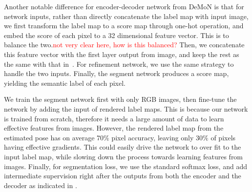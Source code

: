 Another notable difference for encoder-decoder network from DeMoN is that for network inputs, rather than directly concatenate the label map with input image, we first transform the label map to a score map through one-hot operation, and embed the score of each pixel to a 32 dimensional feature vector. This is to balance the two.\textcolor{red}{not very clear here, how is this balanced?} Then, we concatenate this feature vector with the first layer output from image, and keep the rest as the same with that in~\cite{ummenhofer2016demon}. For refinement network, we use the same strategy to handle the two inputs. Finally, the segment network produces a score map, yielding the semantic label of each pixel.

We train the segment network first with only RGB images, then fine-tune the network by adding the input of rendered label maps. This is because our network is trained from scratch, therefore it needs a large amount of data to learn effective features from images. However, the rendered label map from the estimated pose has on average 70$\%$ pixel accuracy, leaving only 30$\%$ of pixels having effective gradients. This could easily drive the network to over fit to the input label map, while slowing down the process towards learning features from images. Finally, for segmentation loss, we use the standard softmax loss, and add intermediate supervision right after the outputs from both the encoder and the decoder as indicated in . 